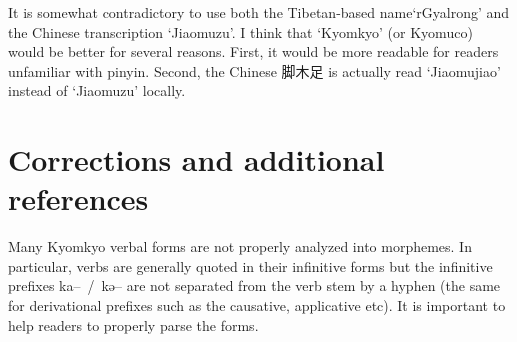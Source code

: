 \documentclass[oldfontcommands,oneside,a4paper,11pt]{article}
\newcommand{\ipa}[1]{{\phon \mbox{#1}}} %
\newcommand{\zh}[1]{{\cn #1}}
\begin{document}
It is somewhat contradictory to use both the Tibetan-based name`rGyalrong' and the Chinese transcription `Jiaomuzu'. I think that `Kyomkyo' (or Kyomuco) would be better for several reasons. First, it would be more readable for readers unfamiliar with pinyin. Second, the Chinese \zh{脚木足} is actually read `Jiaomujiao' instead of `Jiaomuzu' locally. 


 \section{Corrections and additional references}
Many Kyomkyo verbal forms are not properly analyzed into morphemes. In particular, verbs are generally quoted in their infinitive forms but the infinitive prefixes \ipa{ka-- / kə--} are not separated from the verb stem by a hyphen (the same for derivational prefixes such as the causative, applicative etc). It is important to help readers to properly parse the forms.
\end{document}
